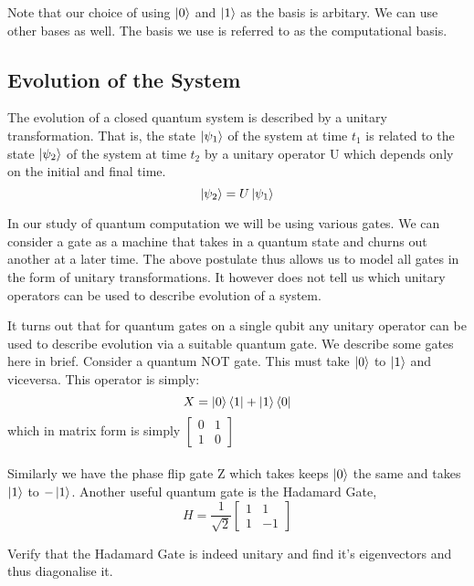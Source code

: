 Note that our choice of using $\ket{0}$ and $\ket{1}$ as the basis is arbitary. We can use other bases as well. The basis we use is referred to as the computational basis.

\subsection{Evolution of the System}
\begin{postulate}
The evolution of a closed quantum system is described by a unitary
transformation. That is, the state $\ket{\psi_1}$ of the system at time $t_1$ is related to the
state $\ket{\psi_2}$ of the system at time $t_2$ by a unitary operator U which depends only on the initial and final time.
$$\ket{\psi_2} = U\ket{\psi_1}$$
\end{postulate}

In our study of quantum computation we will be using various gates. We can consider a gate as a machine that takes in a quantum state and churns out another at a later time. The above postulate thus allows us to model all gates in the form of unitary transformations. It however does not tell us which unitary operators can be used to describe evolution of a system.

It turns out that for quantum gates on a single qubit any unitary operator can be used to describe evolution via a suitable quantum gate.
We describe some gates here in brief. Consider a quantum NOT gate. This must take $\ket{0}$ to $\ket{1}$ and viceversa. This operator is simply:
$$ X = \ket{0}\bra{1} + \ket{1}\bra{0}$$
which in matrix form is simply
$\begin{bmatrix}
0 & 1 \\ 1 & 0
\end{bmatrix}$ \\ \\ 
Similarly we have the phase flip gate Z which takes keeps $\ket{0}$ the same and takes $\ket{1}$ to $-\ket{1}$.
Another useful quantum gate is the Hadamard Gate,
$$ H = \frac{1}{\sqrt{2}}\begin{bmatrix} 1 & 1 \\ 1& -1 \end{bmatrix} $$

\begin{exercise}
Verify that the Hadamard Gate is indeed unitary and find it's eigenvectors and thus diagonalise it.
\end{exercise}

